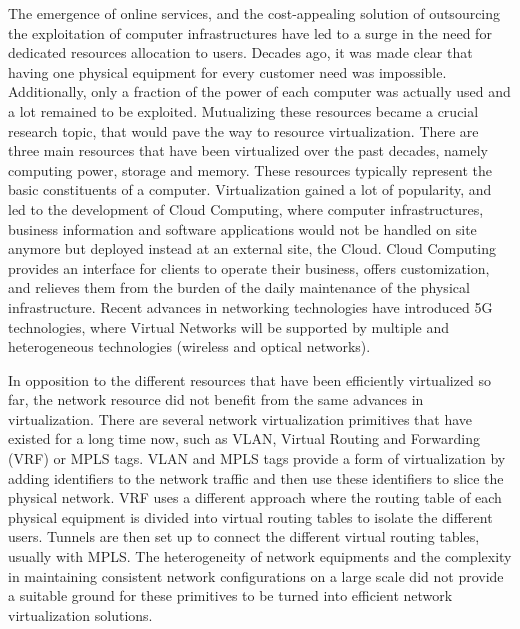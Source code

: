 The emergence of online services, and the cost-appealing solution of outsourcing the exploitation of computer infrastructures have led to a surge in the need for dedicated resources allocation to users. Decades ago, it was made clear that having one physical equipment for every customer need was impossible. Additionally, only a fraction of the power of each computer was actually used and a lot remained to be exploited.
Mutualizing these resources became a crucial research topic, that would pave the way to resource virtualization. 
There are three main resources that have been virtualized over the past decades, namely computing power, storage and memory.
These resources typically represent the basic constituents of a computer.
Virtualization gained a lot of popularity, and led to the development of Cloud Computing, where computer infrastructures, business information and software applications would not be handled on site anymore but deployed instead at an external site, \ie the Cloud.
Cloud Computing provides an interface for clients to operate their business, offers customization, and relieves them from the burden of the daily maintenance of the physical infrastructure. Recent advances in networking technologies have introduced 5G technologies, where Virtual Networks will be supported by multiple and heterogeneous technologies (\eg wireless and optical networks).

In opposition to the different resources that have been efficiently virtualized so far, the network resource did not benefit from the same advances in virtualization.
There are several network virtualization primitives that have existed for a long time now, such as VLAN, Virtual Routing and Forwarding (VRF) or MPLS tags. VLAN and MPLS tags provide a form of virtualization by adding identifiers to the network traffic and then use these identifiers to slice the physical network. VRF uses a different approach where the routing table of each physical equipment is divided into virtual routing tables to isolate the different users. Tunnels are then set up to connect the different virtual routing tables, usually with MPLS.
The heterogeneity of network equipments and the complexity in maintaining consistent network configurations on a large scale did not provide a suitable ground for these primitives to be turned into efficient network virtualization solutions.

